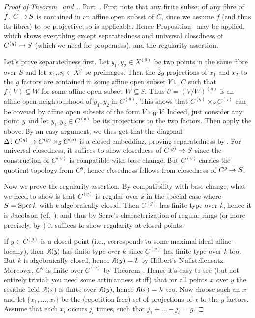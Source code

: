 \documentclass[a4paper,parskip=half,numbers=enddot, DIV=12]{scrreprt}
\begin{document}
\begin{proof}[Proof of Theorem~ and .]
	Part~. First note that any finite subset of any fibre of $f\colon C\morphism S$ is contained in an affine open subset of $C$, since we assume $f$ (and thus its fibres) to be projective, so \cite[Proposition~2.2.1]{alggeo2} is applicable. Hence Proposition~ may be applied, which shows everything except separatedness and universal closedness of $C^{(g)}\morphism S$ (which we need for properness), and the regularity assertion. 
	
	Let's prove separatedness first. Let $y_1,y_2\in X^{(g)}$ be two points in the same fibre over $S$ and let $x_1,x_2\in X^g$ be preimages. Then the $2g$ projections of $x_1$ and $x_2$ to the $g$ factors are contained in some affine open subset $V\subseteq C$ such that $f(V)\subseteq W$ for some affine open subset $W\subseteq S$. Thus $U=(V/W)^{(g)}$ is an affine open neighbourhood of $y_1, y_2$ in $C^{(g)}$. This shows that $C^{(g)}\times_SC^{(g)}$ can be covered by affine open subsets of the form $V\times_WV$. Indeed, just consider any point $y$ and let $y_1,y_2\in C^{(g)}$ be its projections to the two factors. Then apply the above. By an easy argument, we thus get that the diagonal $\Delta\colon C^{(g)}\morphism C^{(g)}\times_SC^{(g)}$ is a closed embedding, proving separatedness by \cite[Fact~1.5.7]{alggeo1}. For universal closedness, it suffices to show closedness of $C^{(g)}\morphism S$ since the construction of $C^{(g)}$ is compatible with base change. But $C^{(g)}$ carries the quotient topology from $C^g$, hence closedness follows from closedness of $C^g\morphism S$.
	
	Now we prove the regularity assertion. By compatibility with base change, what we need to show is that $C^{(g)}$ is regular over $k$ in the special case where $S=\operatorname{Spec} k$ with $k$ algebraically closed. Then $C^{(g)}$ has finite type over $k$, hence it is Jacobson (cf.\ \cite[Definition~2.4.2]{alggeo1}), and thus by Serre's characterization of regular rings (or more precisely, by \cite[Corollary~2.2.1]{homalg}) it suffices to show regularity at closed points.
	
	If $y\in C^{(g)}$ is a closed point (i.e., corresponds to some maximal ideal affine-locally), then $\mathfrak{K}(y)$ has finite type over $k$ since $C^{(g)}$ has finite type over $k$ too. But $k$ is algebraically closed, hence $\mathfrak{K}(y)=k$ by Hilbert's Nullstellensatz. Moreover, $C^g$ is finite over $C^{(g)}$ by Theorem~. Hence it's easy to see (but not entirely trivial; you need some artinianness stuff) that for all points $x$ over $y$ the residue field $\mathfrak{K}(x)$ is finite over $\mathfrak{K}(y)$, hence $\mathfrak{K}(x)=k$ too. Now choose such an $x$ and let $\{x_1,\ldots,x_\ell\}$ be the (repetition-free) set of projections of $x$ to the $g$ factors. Assume that each $x_i$ occurs $j_i$ times, such that $j_1+\ldots+j_\ell=g$.
	

\end{proof}
\end{document}
